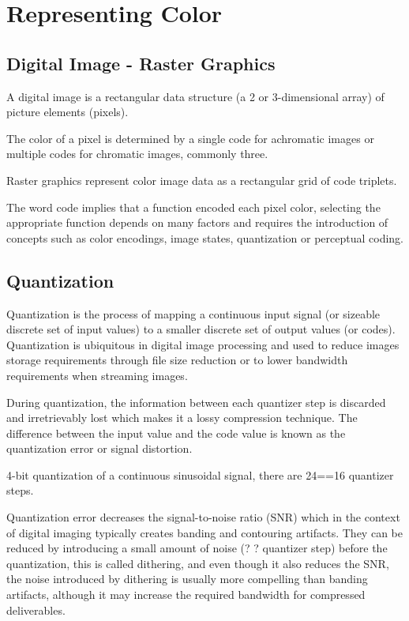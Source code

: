 \section{Representing Color}%
\label{sec:representing-color}

\subsection{Digital Image - Raster Graphics}%
\label{subsec:digital-image-raster-graphics}

A digital image is a rectangular data structure (a 2 or 3-dimensional array) of picture elements (pixels).

The color of a pixel is determined by a single code for achromatic images or multiple codes for chromatic images, commonly three.

Raster graphics represent color image data as a rectangular grid of code triplets.

The word code implies that a function encoded each pixel color, selecting the appropriate function depends on many factors and requires the introduction of concepts such as color encodings, image states, quantization or perceptual coding.

\subsection{Quantization}%
\label{subsec:quantization}

Quantization is the process of mapping a continuous input signal (or sizeable discrete set of input values) to a smaller discrete set of output values (or codes). Quantization is ubiquitous in digital image processing and used to reduce images storage requirements through file size reduction or to lower bandwidth requirements when streaming images.

During quantization, the information between each quantizer step is discarded and irretrievably lost which makes it a lossy compression technique. The difference between the input value and the code value is known as the quantization error or signal distortion.

4-bit quantization of a continuous sinusoidal signal, there are 24==16 quantizer steps.


Quantization error decreases the signal-to-noise ratio (SNR) which in the context of digital imaging typically creates banding and contouring artifacts. They can be reduced by introducing a small amount of noise (? ? quantizer step) before the quantization, this is called dithering, and even though it also reduces the SNR, the noise introduced by dithering is usually more compelling than banding artifacts, although it may increase the required bandwidth for compressed deliverables.

